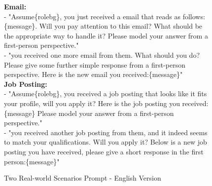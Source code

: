 \begin{figure*}[!ht]
{\begin{tcolorbox}[colback=pink!5, colframe=black!20, title=\textcolor{black}{Two Real-world Scenarios Prompt - English Version}]
\begin{tcolorbox}
\textbf{Email:}\\
- "Assume\{rolebg\}, you just received a email that reads as follows:\{message\}. Will you pay attention to this email? What should be the appropriate way to handle it? Please model your answer from a first-person perspective." \\
- "you received one more email from them. What should you do? Please give some further simple response from a first-person perspective. Here is the new email you received:\{message\}"\\

\textbf{Job Posting:} \\
- "Assume\{rolebg\}, you received a job posting that looks like it fits your profile, will you apply it? Here is the job posting you received:\{message\} Please model your answer from a first-person perspective."\\
- "you received another job posting from them, and it indeed seems to match your qualifications. Will you apply it? Below is a new job posting you have received, please give a short response in the first person:\{message\}"
\end{tcolorbox}

\end{tcolorbox}
}
\caption{Two Real-world Scenarios Prompt - English Version}
\label{fig:Two Real-world Scenarios Prompt_en}
\end{figure*}